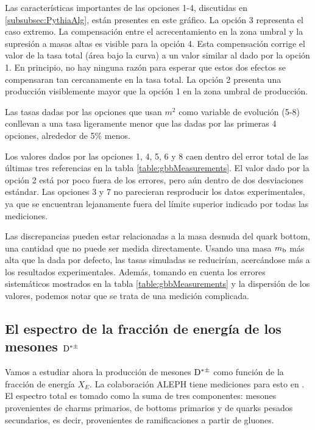 Las características importantes de las opciones 1-4, discutidas en \ref{subsubsec:PythiaAlg}, están presentes en este gráfico. La opción 3 representa el caso extremo. La compensación entre el acrecentamiento en la zona umbral y la supresión a masas altas es visible para la opción 4. Esta compensación corrige el valor de la tasa total (área bajo la curva) a un valor similar al dado por la opción 1. En principio, no hay ninguna razón para esperar que estos dos efectos se compensaran tan cercanamente en la tasa total. La opción 2 presenta una producción visiblemente mayor que la opción 1 en la zona umbral de producción.

Las tasas dadas por las opciones que usan $m^2$ como variable de evolución (5-8) conllevan a una tasa ligeramente menor que las dadas por las primeras 4 opciones, alrededor de 5\% menos.

Los valores dados por las opciones 1, 4, 5, 6 y 8 caen dentro del error total de las últimas tres referencias en la tabla \ref{table:gbbMeasurements}. El valor dado por la opción 2 está por poco fuera de los errores, pero aún dentro de dos desviaciones estándar. Las opciones 3 y 7 no parecieran resproducir los datos experimentales, ya que se encuentran lejanamente fuera del límite superior indicado por todas las mediciones.

Las discrepancias pueden estar relacionadas a la masa desnuda del quark bottom, una cantidad que no puede ser medida directamente. Usando una masa $m_{\mathrm b}$ más alta que la dada por defecto, las tasas simuladas se reducirían, acercándose más a los resultados experimentales. Además, tomando en cuenta los errores sistemáticos mostrados en la tabla \ref{table:gbbMeasurements} y la dispersión de los valores, podemos notar que se trata de una medición complicada.

\subsection{El espectro de la fracción de energía de los mesones ${\mathrm D}^{*\pm}$}

Vamos a estudiar ahora la producción de mesones ${\mathrm D}^{*\pm}$ como función de la fracción de energía $X_E$. La colaboración ALEPH tiene mediciones para esto en \cite{Barate:1999bg}. El espectro total es tomado como la suma de tres componentes: mesones provenientes de charms primarios, de bottoms primarios y de quarks pesados secundarios, es decir, provenientes de ramificaciones a partir de gluones.

